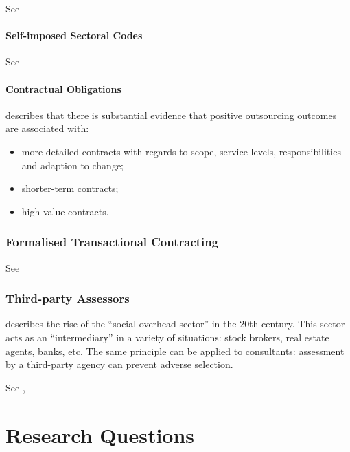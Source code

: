 \documentclass[12pt]{article}
\providecommand{\tightlist}{%
  \setlength{\itemsep}{0pt}\setlength{\parskip}{0pt}}
\begin{document}
See \citet[3-4]{sturdy2021}

\hypertarget{self-imposed-sectoral-codes}{%
\paragraph{Self-imposed Sectoral
Codes}\label{self-imposed-sectoral-codes}}

See \citet[4]{sturdy2021}

\hypertarget{contractual-obligations}{%
\paragraph{Contractual Obligations}\label{contractual-obligations}}

\citet[4]{lacity2012} describes that there is substantial evidence that
positive outsourcing outcomes are associated with:

\begin{itemize}
\tightlist
\item
  more detailed contracts with regards to scope, service levels,
  responsibilities and adaption to change;
\item
  shorter-term contracts;
\item
  high-value contracts.
\end{itemize}

\hypertarget{formalised-transactional-contracting}{%
\subsubsection{Formalised Transactional
Contracting}\label{formalised-transactional-contracting}}

See \citet[4-5]{sturdy2021}

\hypertarget{third-party-assessors}{%
\subsubsection{Third-party Assessors}\label{third-party-assessors}}

\citet[57-62]{zucker1985} describes the rise of the ``social overhead
sector'' in the 20th century. This sector acts as an ``intermediary'' in
a variety of situations: stock brokers, real estate agents, banks, etc.
The same principle can be applied to consultants: assessment by a
third-party agency can prevent adverse selection.

See \citep[ 76-77]{armbruster2006},

\hypertarget{research-questions}{%
\section{Research Questions}\label{research-questions}}
\end{document}
